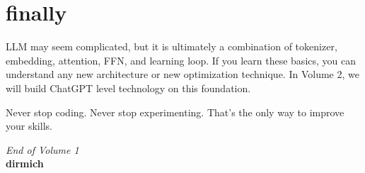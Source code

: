 \section{finally}

LLM may seem complicated, but it is ultimately a combination of tokenizer, embedding, attention, FFN, and learning loop. If you learn these basics, you can understand any new architecture or new optimization technique. In Volume 2, we will build ChatGPT level technology on this foundation.

Never stop coding. Never stop experimenting. That's the only way to improve your skills.

\begin{flushright}
\textit{End of Volume 1}\\[0.5em]
\textbf{dirmich}
\end{flushright}
